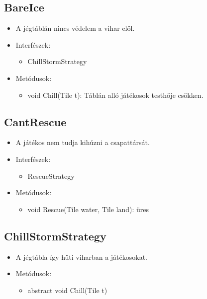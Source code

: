 \subsection{BareIce}
\begin{itemize}
\item A jégtáblán nincs védelem a vihar elől.\\

\item Interfészek:

	\begin{itemize}
		\item ChillStormStrategy
	\end{itemize}

\item Metódusok:
	\begin{itemize}
		\item void Chill(Tile t): Táblán alló játékosok testhője csökken.
	\end{itemize}
\end{itemize}

\subsection{CantRescue}
\begin{itemize}
	\item A játékos nem tudja kihúzni a csapattársát.
	
\item Interfészek:
\begin{itemize}
	\item RescueStrategy
\end{itemize}

\item Metódusok:
\begin{itemize}
	\item void Rescue(Tile water, Tile land): üres
\end{itemize}
\end{itemize}

\subsection{ChillStormStrategy}
\begin{itemize}
	\item A jégtábla így hűti viharban a játékosokat.

	\item Metódusok:
	\begin{itemize}
		\item abstract void Chill(Tile t)
	\end{itemize}
\end{itemize}

